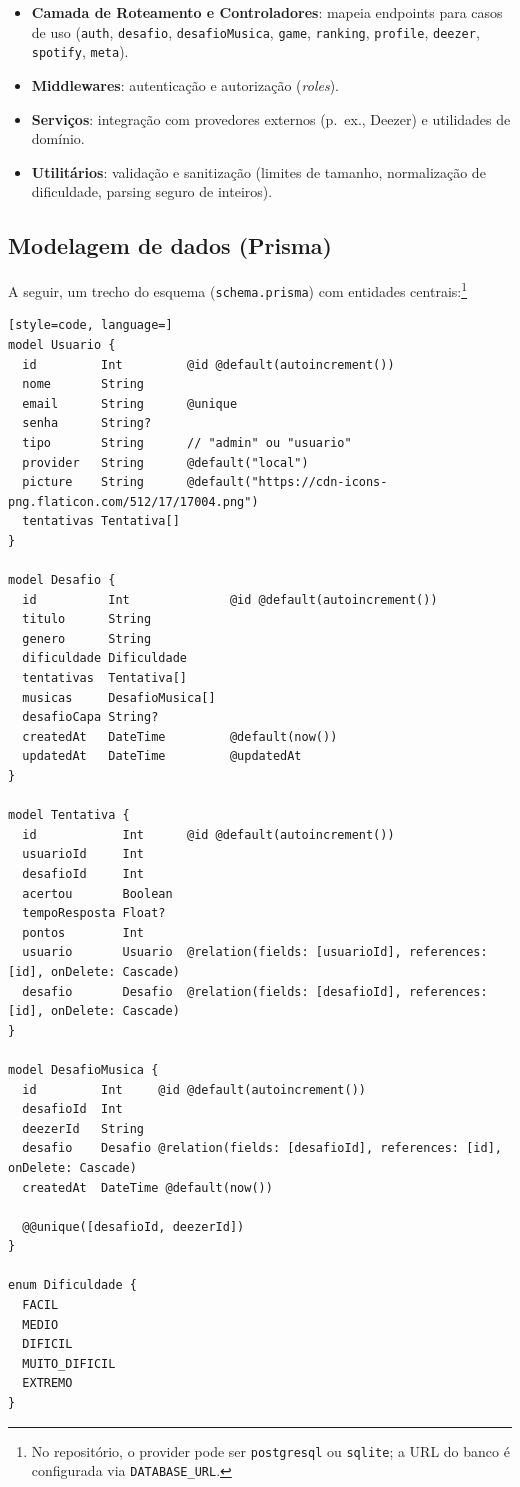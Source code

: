 \documentclass[12pt,a4paper]{article}
\begin{document}
\begin{itemize}
  \item \textbf{Camada de Roteamento e Controladores}: mapeia endpoints para casos de uso (\texttt{auth}, \texttt{desafio}, \texttt{desafioMusica}, \texttt{game}, \texttt{ranking}, \texttt{profile}, \texttt{deezer}, \texttt{spotify}, \texttt{meta}).
  \item \textbf{Middlewares}: autenticação e autorização (\textit{roles}).
  \item \textbf{Serviços}: integração com provedores externos (p.~ex., Deezer) e utilidades de domínio.
  \item \textbf{Utilitários}: validação e sanitização (limites de tamanho, normalização de dificuldade, parsing seguro de inteiros).
\end{itemize}

\subsection{Modelagem de dados (Prisma)}
A seguir, um trecho do esquema (\texttt{schema.prisma}) com entidades centrais:\footnote{No repositório, o provider pode ser \texttt{postgresql} ou \texttt{sqlite}; a URL do banco é configurada via \texttt{DATABASE\_URL}.}

\begin{lstlisting}[style=code, language=]
model Usuario {
  id         Int         @id @default(autoincrement())
  nome       String
  email      String      @unique
  senha      String?
  tipo       String      // "admin" ou "usuario"
  provider   String      @default("local")
  picture    String      @default("https://cdn-icons-png.flaticon.com/512/17/17004.png")
  tentativas Tentativa[]
}

model Desafio {
  id          Int              @id @default(autoincrement())
  titulo      String
  genero      String
  dificuldade Dificuldade
  tentativas  Tentativa[]
  musicas     DesafioMusica[]
  desafioCapa String?
  createdAt   DateTime         @default(now())
  updatedAt   DateTime         @updatedAt
}

model Tentativa {
  id            Int      @id @default(autoincrement())
  usuarioId     Int
  desafioId     Int
  acertou       Boolean
  tempoResposta Float?
  pontos        Int
  usuario       Usuario  @relation(fields: [usuarioId], references: [id], onDelete: Cascade)
  desafio       Desafio  @relation(fields: [desafioId], references: [id], onDelete: Cascade)
}

model DesafioMusica {
  id         Int     @id @default(autoincrement())
  desafioId  Int
  deezerId   String
  desafio    Desafio @relation(fields: [desafioId], references: [id], onDelete: Cascade)
  createdAt  DateTime @default(now())

  @@unique([desafioId, deezerId])
}

enum Dificuldade {
  FACIL
  MEDIO
  DIFICIL
  MUITO_DIFICIL
  EXTREMO
}
\end{lstlisting}
\end{document}
